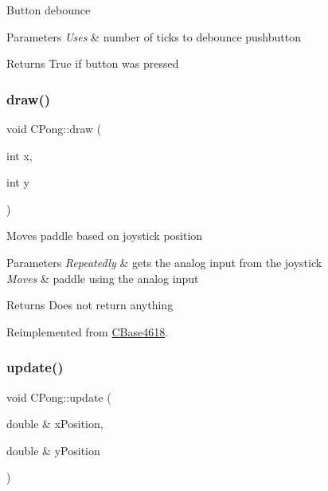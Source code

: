 Button debounce


\begin{DoxyParams}{Parameters}
{\em Uses} & number of ticks to debounce pushbutton\\
\hline
\end{DoxyParams}
\begin{DoxyReturn}{Returns}
True if button was pressed 
\end{DoxyReturn}
\hypertarget{class_c_pong_ac4687aab31fbe5912cac2058663163fa}{}\label{class_c_pong_ac4687aab31fbe5912cac2058663163fa} 
\subsubsection{\texorpdfstring{draw()}{draw()}}
{\footnotesize\ttfamily void C\+Pong\+::draw (\begin{DoxyParamCaption}\item[{int}]{x,  }\item[{int}]{y }\end{DoxyParamCaption})\hspace{0.3cm}{\ttfamily [virtual]}}

Moves paddle based on joystick position


\begin{DoxyParams}{Parameters}
{\em Repeatedly} & gets the analog input from the joystick \\
\hline
{\em Moves} & paddle using the analog input\\
\hline
\end{DoxyParams}
\begin{DoxyReturn}{Returns}
Does not return anything 
\end{DoxyReturn}


Reimplemented from \hyperlink{class_c_base4618_aa4e8190003db02c98e7e6bdcfdf0ee1a}{C\+Base4618}.

\hypertarget{class_c_pong_a036cdd714486e765a658b835547d058e}{}\label{class_c_pong_a036cdd714486e765a658b835547d058e} 
\subsubsection{\texorpdfstring{update()}{update()}}
{\footnotesize\ttfamily void C\+Pong\+::update (\begin{DoxyParamCaption}\item[{double \&}]{x\+Position,  }\item[{double \&}]{y\+Position }\end{DoxyParamCaption})\hspace{0.3cm}{\ttfamily [virtual]}}

